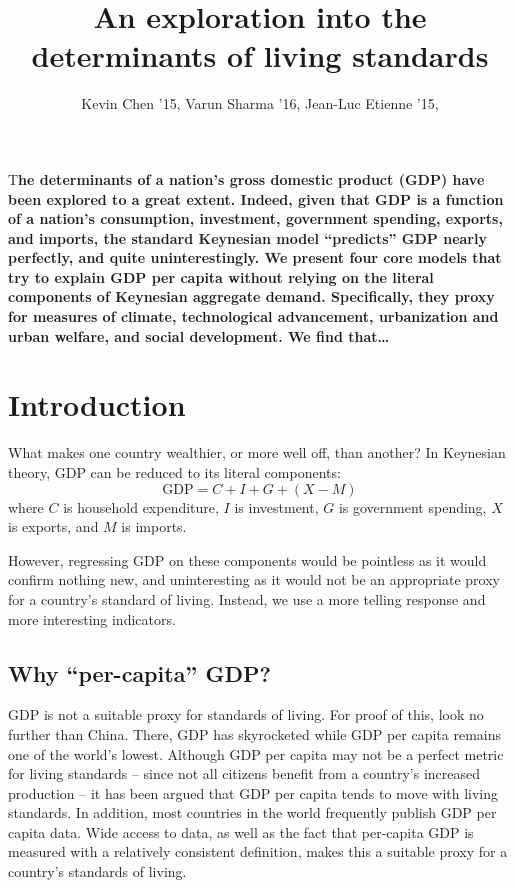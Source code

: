 \documentclass[DIV=calc, paper=a4, fontsize=12pt, twocolumn]{scrartcl} %
\title{An exploration into the determinants of living standards} %
\author{Kevin Chen '15, Varun Sharma '16, Jean-Luc Etienne '15, } %
\date{} %
\newcommand{\initial}[1]{ %
\lettrine[lines=3,lhang=0.3,nindent=0em]{
\color{DarkGoldenrod}
{\textsf{#1}}}{}}
\begin{document}
\maketitle %
\doublespacing
\thispagestyle{fancy} %




\initial{T}\textbf{he determinants of a nation's gross domestic product (GDP) have been explored to a great extent.
Indeed, given that GDP is a function of a nation's
consumption, investment, government spending, exports, and imports,
the standard Keynesian model ``predicts'' GDP nearly perfectly, and quite uninterestingly.
We present four core models that try to explain GDP per capita without
relying on the literal components of Keynesian aggregate demand.
Specifically, they proxy for measures of climate, technological advancement,
urbanization and urban welfare, and social development.
We find that\dots}



\section{Introduction}
What makes one country wealthier, or more well off, than another?
In Keynesian theory, GDP can be reduced to its literal components:
$$\mathrm{GDP} = C + I + G + (X - M)$$
where 
$C$ is household expenditure, 
$I$ is investment, 
$G$ is government spending,
$X$ is exports, and
$M$ is imports.

However, regressing GDP on these components would be pointless as it would confirm nothing new,
and uninteresting as it would not be an appropriate proxy for a country's standard of living.
Instead, we use a more telling response and more interesting indicators.

\subsection{Why ``per-capita'' GDP?}
GDP is not a suitable proxy for standards of living.
For proof of this, look no further than China.
There, GDP has skyrocketed while GDP per capita remains one of the world's lowest. 
Although GDP per capita may not be a perfect metric for living standards -- 
since not all citizens benefit from a country's increased production -- 
it has been argued that GDP per capita tends to move with living standards.
In addition, most countries in the world frequently publish GDP per capita data.
Wide access to data, as well as the fact that per-capita GDP is measured 
with a relatively consistent definition, makes this a suitable proxy for a
country's standards of living.
\end{document}
